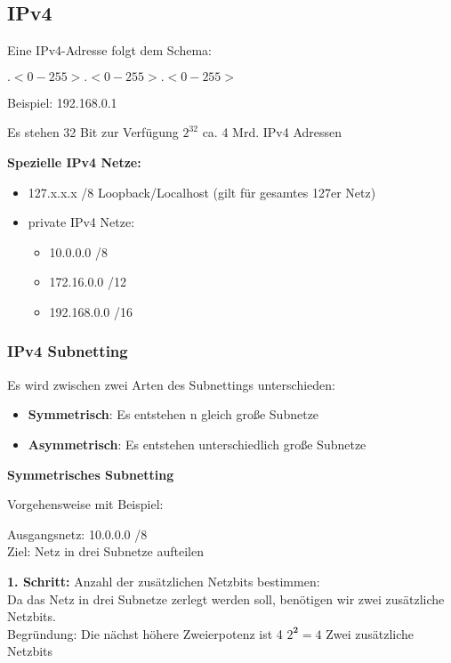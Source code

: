 \documentclass[asp1.tex]{subfiles}
\begin{document}
\subsection{IPv4}

Eine IPv4-Adresse folgt dem Schema:

\(<0-255>.<0-255>.<0-255>.<0-255>\)

Beispiel: 192.168.0.1

Es stehen 32 Bit zur Verfügung \textrightarrow\space \(2^{32}\) \textrightarrow\space ca. 4 Mrd. IPv4 Adressen

\textbf{Spezielle IPv4 Netze:}
\begin{itemize}
    \item 127.x.x.x /8 \textrightarrow\space Loopback/Localhost (gilt für gesamtes 127er Netz)
    \item private IPv4 Netze:
        \begin{itemize}
            \item 10.0.0.0 /8
            \item 172.16.0.0 /12
            \item 192.168.0.0 /16
        \end{itemize}
\end{itemize}

\subsubsection{IPv4 Subnetting}

Es wird zwischen zwei Arten des Subnettings unterschieden:
\begin{itemize}
    \item \textbf{Symmetrisch}: Es entstehen n gleich große Subnetze
    \item \textbf{Asymmetrisch}: Es entstehen unterschiedlich große Subnetze
\end{itemize}

\textbf{Symmetrisches Subnetting}

Vorgehensweise mit Beispiel:

Ausgangsnetz: 10.0.0.0 /8\\
Ziel: Netz in drei Subnetze aufteilen

\textbf{1. Schritt:} Anzahl der zusätzlichen Netzbits bestimmen:\\
Da das Netz in drei Subnetze zerlegt werden soll, benötigen wir zwei zusätzliche Netzbits.\\
Begründung: Die nächst höhere Zweierpotenz ist 4 \textrightarrow\space \(2^\textbf{2} = 4\) \textrightarrow\space Zwei zusätzliche Netzbits
\end{document}
